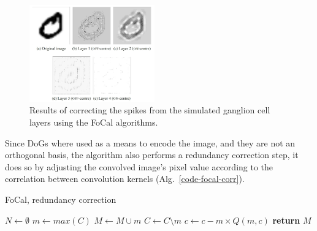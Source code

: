 \documentclass{frontiersENG} %
\begin{document}
\begin{figure}[hbt]
	\centering
	\includegraphics[width=0.48\textwidth]{fig2}
	\caption{Results of correcting the spikes from the simulated ganglion cell layers using the FoCal algorithms.}
	\label{fig-convolution-results}
\end{figure}
Since DoGs where used as a means to encode the image, and they are not an orthogonal basis, the algorithm also performs a redundancy correction step, it does so by 
adjusting the convolved image's pixel value according to the correlation 
between convolution kernels (Alg.~\ref{code-focal-corr}).
\begin{algorithm}[h]
	\caption{FoCal, redundancy correction}
	\label{code-focal-corr}
	\begin{algorithmic}
		\State $N \leftarrow \emptyset$ 
		\Repeat
		\State $m \leftarrow max(C)$
		\State $M \leftarrow M \cup m$
		\State $C \leftarrow C \setminus m$
		 
		 
		\State $c \leftarrow c - m \times Q(m, c)$
		\EndIf
		\EndFor
		\State \textbf{return} $M$
		\EndProcedure
	\end{algorithmic}
\end{algorithm}
\end{document}
